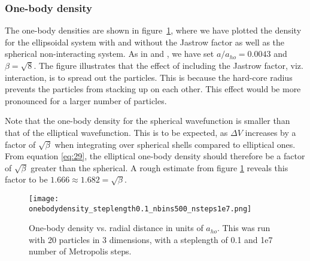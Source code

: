 \documentclass[
    a4paper, aps, twocolumn, floatfix, superscriptaddress,
    nofootinbib]{revtex4-1}
\begin{document}
\subsubsection{One-body density}
The one-body densities are shown in figure~\ref{fig:g_onebody_density}, where we have plotted the density for the ellipsoidal system with and without the Jastrow factor as well as the spherical non-interacting system. As in \cite{vortex} and \cite{trapped}, we have set $a/a_{ho} = 0.0043$ and $\beta = \sqrt{8}$. The figure illustrates that the effect of including the Jastrow factor, viz. interaction, is to spread out the particles. This is because the hard-core radius prevents the particles from stacking up on each other. This effect would be more pronounced for a larger number of particles. 

Note that the one-body density for the spherical wavefunction is smaller than that of the elliptical wavefunction. This is to be expected, as $\Delta V$ increases by a factor of $\sqrt{\beta}$ when integrating over spherical shells compared to elliptical ones. From equation \eqref{eq:29}, the elliptical one-body density should therefore be a factor of $\sqrt{\beta}$ greater than the spherical. A rough estimate from figure \ref{fig:g_onebody_density} reveals this factor to be $1.666 \approx 1.682 = \sqrt{\beta}$.

\begin{figure}[h]
    \centering
    \texttt{[image: onebodydensity\_steplength0.1\_nbins500\_nsteps1e7.png]}
    \caption{One-body density vs. radial distance in units of $a_{ho}$. This was run with 20 particles in 3 dimensions, with a steplength of 0.1 and 1e7 number of Metropolis steps.}
    \label{fig:g_onebody_density}
\end{figure}
\end{document}
